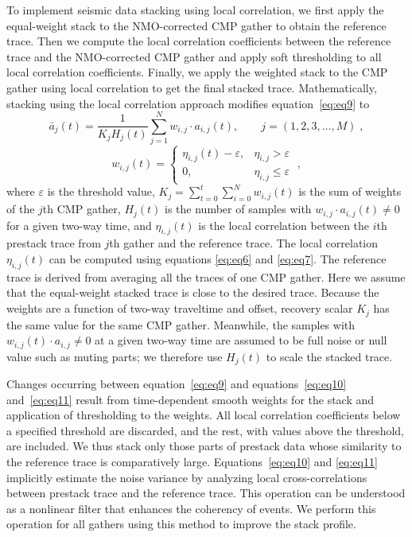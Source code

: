 To implement seismic data stacking using local correlation, we
first apply the equal-weight stack to the NMO-corrected CMP gather
to obtain the reference trace. Then we compute the local correlation
coefficients between the reference trace and the NMO-corrected
CMP gather and apply soft thresholding \cite[]{Donoho95} to all local
correlation coefficients. Finally, we apply the weighted stack to the
CMP gather using local correlation to get the final stacked trace.
Mathematically, stacking using the local correlation approach
modifies equation~\ref{eq:eq9} to
      \begin{equation}
          \bar{a}_j(t) = \frac{1}{K_j H_j(t)}\displaystyle\sum_{j=1}^{N} w_{i,j} \cdot a_{i,j}(t), \qquad j=(1,2,3,\dots,M) \;,
        \label{eq:eq10}
      \end{equation}
      \begin{equation}
          w_{i,j}(t) = \left \{ \begin{array}{ll}
                    \eta_{i,j}(t)-\varepsilon, & \eta_{i,j}> \varepsilon\\
		    0, & \eta_{i,j}\le \varepsilon
                  \end{array} \right.\;,
        \label{eq:eq11}
      \end{equation}
where $\varepsilon$ is the threshold value, 
$K_j = \displaystyle\sum_{t=0}^{t}\sum_{i=0}^{N}w_{i,j}(t)$
is the sum of weights of the $j$th CMP gather, $H_j(t)$ is the number of 
samples with $w_{i,j}\cdot a_{i,j}(t)\ne0$ for a given two-way time, and 
$\eta_{i,j}(t)$ is the local correlation
between the $i$th prestack trace from $j$th gather and the reference
trace. The local correlation $\eta_{i,j}(t)$ can be computed using equations
\ref{eq:eq6} and \ref{eq:eq7}. The reference trace is derived from averaging 
all the traces of one CMP gather. Here we assume that the equal-weight
stacked trace is close to the desired trace. Because the weights are a 
function of two-way traveltime and offset, recovery scalar $K_j$ has the same 
value for the same CMP gather. Meanwhile, the samples with 
$w_{i,j}(t)\cdot a_{i,j}\ne0$ at a given two-way time are assumed to be full 
noise or null value such as muting parts; we therefore use $H_j(t)$ to
scale the stacked trace.

Changes occurring between equation~\ref{eq:eq9} and equations~\ref{eq:eq10} 
and~\ref{eq:eq11} result from time-dependent smooth weights for the stack and 
application of thresholding to the weights. All local correlation coefficients 
below a specified threshold are discarded, and the rest, with values above the 
threshold, are included. We thus stack only those parts of prestack data whose 
similarity to the reference trace is comparatively large. 
Equations~\ref{eq:eq10} and \ref{eq:eq11} implicitly estimate the noise 
variance by analyzing local cross-correlations between prestack trace and the 
reference trace. This operation can be understood as a nonlinear filter that 
enhances the coherency of events. We perform this operation for all gathers 
using this method to improve the stack profile.


